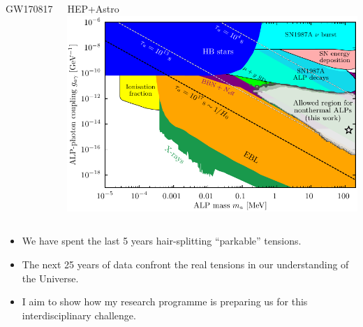 \documentclass[aspectratio=169, handout]{beamer}
\begin{document}
\begin{frame}
\begin{columns}
\begin{block}{GW170817}
        \end{block}
        \begin{block}{HEP+Astro}
            \includegraphics[width=\textwidth]{figures/cosmoalp.pdf}

            \hfill{}
        \end{block}
    \end{columns}

    \begin{itemize}
        \item We have spent the last 5 years hair-splitting ``parkable'' tensions.
        \item The next 25 years of data confront the real tensions in our understanding of the Universe.
        \item I aim to show how my research programme is preparing us for this interdisciplinary challenge.
    \end{itemize}

\end{frame}
\end{document}
